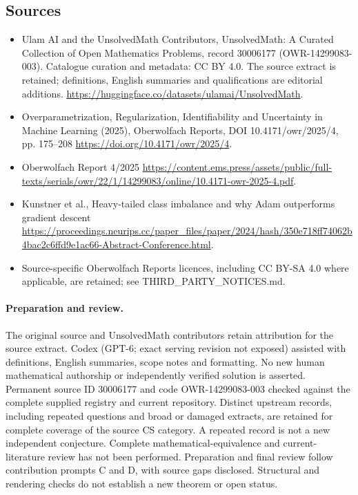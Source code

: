 \documentclass[11pt]{article}
\begin{document}
\subsection{Sources}
\begin{itemize}
\item[S1] Ulam AI and the UnsolvedMath Contributors, UnsolvedMath: A Curated Collection of Open Mathematics Problems, record 30006177 (OWR-14299083-003). Catalogue curation and metadata: CC BY 4.0. The source extract is retained; definitions, English summaries and qualifications are editorial additions.
\url{https://huggingface.co/datasets/ulamai/UnsolvedMath}.
\item[S2] Overparametrization, Regularization, Identifiability and Uncertainty in Machine Learning (2025), Oberwolfach Reports, DOI 10.4171/owr/2025/4, pp. 175--208
\url{https://doi.org/10.4171/owr/2025/4}.
\item[S3] Oberwolfach Report 4/2025
\url{https://content.ems.press/assets/public/full-texts/serials/owr/22/1/14299083/online/10.4171-owr-2025-4.pdf}.
\item[S4] Kunstner et al., Heavy-tailed class imbalance and why Adam outperforms gradient descent
\url{https://proceedings.neurips.cc/paper_files/paper/2024/hash/350e718ff74062b4bac2c6ffd9e1ac66-Abstract-Conference.html}.
\item Source-specific Oberwolfach Reports licences, including CC BY-SA 4.0 where applicable, are retained; see THIRD\_PARTY\_NOTICES.md.
\end{itemize}
\paragraph{Preparation and review.}
The original source and UnsolvedMath contributors retain attribution for the source extract. Codex (GPT-6; exact serving revision not exposed) assisted with definitions, English summaries, scope notes and formatting. No new human mathematical authorship or independently verified solution is asserted. Permanent source ID 30006177 and code OWR-14299083-003 checked against the complete supplied registry and current repository. Distinct upstream records, including repeated questions and broad or damaged extracts, are retained for complete coverage of the source CS category. A repeated record is not a new independent conjecture. Complete mathematical-equivalence and current-literature review has not been performed. Preparation and final review follow contribution prompts C and D, with source gaps disclosed. Structural and rendering checks do not establish a new theorem or open status.
\label{end:30006177}
\end{document}
